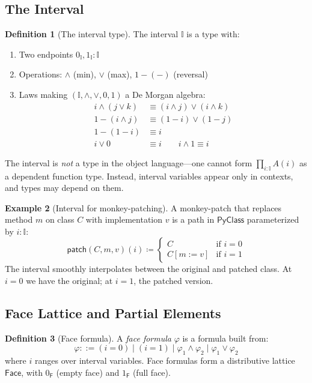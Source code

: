 \documentclass[11pt,a4paper]{report}
\theoremstyle{definition}
\newtheorem{definition}{Definition}[chapter]
\newtheorem{example}[definition]{Example}
\theoremstyle{plain}
\newcommand{\PyClass}{\mathsf{PyClass}}
\newcommand{\interval}{\mathbb{I}}
\newcommand{\defeq}{\coloneqq}
\begin{document}
\subsection{The Interval}

\begin{definition}[The interval type]
The interval $\interval$ is a type with:
\begin{enumerate}
  \item Two endpoints $0_\interval, 1_\interval : \interval$
  \item Operations: $\land$ (min), $\lor$ (max), $1 - (-)$ (reversal)
  \item Laws making $(\interval, \land, \lor, 0, 1)$ a De Morgan algebra:
    \begin{align}
      i \land (j \lor k) &\equiv (i \land j) \lor (i \land k) \\
      1 - (i \land j) &\equiv (1 - i) \lor (1 - j) \\
      1 - (1 - i) &\equiv i \\
      i \lor 0 &\equiv i \qquad i \land 1 \equiv i
    \end{align}
\end{enumerate}
\end{definition}

The interval is \emph{not} a type in the object language---one cannot form
$\prod_{i:\interval} A(i)$ as a dependent function type.  Instead, interval
variables appear only in contexts, and types may depend on them.

\begin{example}[Interval for monkey-patching]
A monkey-patch that replaces method $m$ on class $C$ with implementation $v$
is a path in $\PyClass$ parameterized by $i : \interval$:
\[
  \mathsf{patch}(C, m, v)(i) \defeq
  \begin{cases}
    C & \text{if } i = 0 \\
    C[m := v] & \text{if } i = 1
  \end{cases}
\]
The interval smoothly interpolates between the original and patched class.
At $i = 0$ we have the original; at $i = 1$, the patched version.
\end{example}

\subsection{Face Lattice and Partial Elements}

\begin{definition}[Face formula]
A \emph{face formula} $\varphi$ is a formula built from:
\[
  \varphi ::= (i = 0) \mid (i = 1) \mid \varphi_1 \land \varphi_2 \mid \varphi_1 \lor \varphi_2
\]
where $i$ ranges over interval variables.  Face formulas form a distributive
lattice $\mathsf{Face}$, with $0_\mathsf{F}$ (empty face) and $1_\mathsf{F}$
(full face).
\end{definition}
\end{document}
